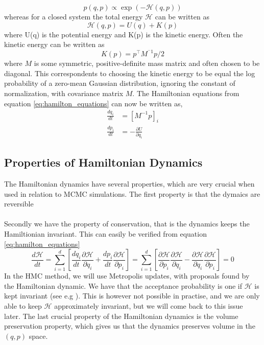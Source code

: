 \begin{equation*}
p(q,p)\propto \exp(-\mathcal{H}(q,p))    
\end{equation*}
whereas for a closed system the total energy $\mathcal{H}$ can be written as 
\begin{equation*}
    \mathcal{H}(q,p)=U(q)+K(p)
\end{equation*}
where U(q) is the potential energy and K(p) is the kinetic energy. Often the kinetic energy can be written as
\begin{equation*}
    K(p)=p^\top M^{^-1}p/2
\end{equation*}
where $M$ is some symmetric, positive-definite mass matrix and often chosen to be diagonal. This correspondents to choosing the kinetic energy to be equal the log probability of a zero-mean Gaussian distribution, ignoring the constant of normalization, with covariance matrix $M$. The Hamiltonian equations from equation \ref{eq:hamilton_equations} can now be written as,
\begin{equation*}
\begin{split}
\frac{d q_{i}}{d t}&=\left[M^{-1}p\right]_i \\
\frac{d p_{i}}{d t}&=-\frac{\partial U}{\partial q_i}
\end{split}
\end{equation*}
\subsection{Properties of Hamiltonian Dynamics}
The Hamiltonian dynamics have several properties, which are very crucial when used in relation to MCMC simulations. The first property is that the dymaics are reversible
\\
\\
Secondly we have the property of conservation, that is the dynamics keeps the Hamiltionian invariant. This can easily be verified from equation \ref{eq:hamilton_equations}
\begin{equation*}
    \frac{d \mathcal{H}}{d t}=\sum_{i=1}^{d}\left[\frac{d q_{i}}{d t} \frac{\partial \mathcal{H}}{\partial q_{i}}+\frac{d p_{i}}{d t} \frac{\partial \mathcal{H}}{\partial p_{i}}\right]=\sum_{i=1}^{d}\left[\frac{\partial \mathcal{H}}{\partial p_{i}} \frac{\partial \mathcal{H}}{\partial q_{i}}-\frac{\partial \mathcal{H}}{\partial q_{i}} \frac{\partial \mathcal{H}}{\partial p_{i}}\right]=0
\end{equation*}
In the HMC method, we will use Metropolis updates, with proposals found by the Hamiltonian dynamic. We have that the acceptance probability is one if $\mathcal{H}$ is kept invariant (see e.g \cite{neal2012mcmc}). This is however not possible in practise, and we are only able to keep $\mathcal{H}$ approximately invariant, but we will come back to this issue later. The last crucial property of the Hamiltonian dynamics is the volume preservation property, which gives us that the dynamics preserves volume in the $(q,p)$ space.

